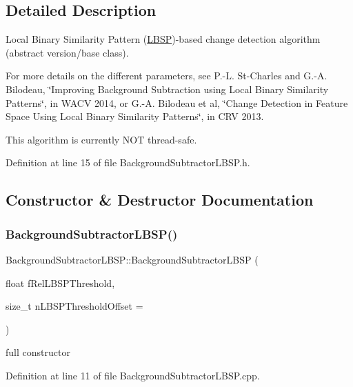 \subsection{Detailed Description}
Local Binary Similarity Pattern (\mbox{\hyperlink{class_l_b_s_p}{L\+B\+SP}})-\/based change detection algorithm (abstract version/base class).

For more details on the different parameters, see P.-\/L. St-\/\+Charles and G.-\/A. Bilodeau, \char`\"{}\+Improving Background
\+Subtraction using Local Binary Similarity Patterns\char`\"{}, in W\+A\+CV 2014, or G.-\/A. Bilodeau et al, \char`\"{}\+Change Detection
in Feature Space Using Local Binary Similarity Patterns\char`\"{}, in C\+RV 2013.

This algorithm is currently N\+OT thread-\/safe. 

Definition at line 15 of file Background\+Subtractor\+L\+B\+S\+P.\+h.



\subsection{Constructor \& Destructor Documentation}
\mbox{\label{class_background_subtractor_l_b_s_p_a5f7f42ea5c9697479cbe237b49ca6ae9}} 
\subsubsection{\texorpdfstring{Background\+Subtractor\+L\+B\+S\+P()}{BackgroundSubtractorLBSP()}}
{\footnotesize\ttfamily Background\+Subtractor\+L\+B\+S\+P\+::\+Background\+Subtractor\+L\+B\+SP (\begin{DoxyParamCaption}\item[{float}]{f\+Rel\+L\+B\+S\+P\+Threshold,  }\item[{size\+\_\+t}]{n\+L\+B\+S\+P\+Threshold\+Offset = {} }\end{DoxyParamCaption})}



full constructor 



Definition at line 11 of file Background\+Subtractor\+L\+B\+S\+P.\+cpp.


